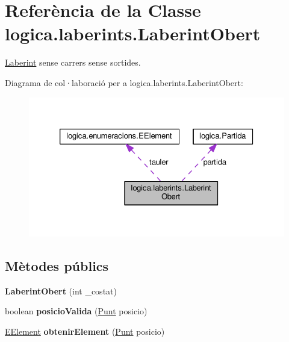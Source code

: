 \hypertarget{classlogica_1_1laberints_1_1_laberint_obert}{\section{Referència de la Classe logica.\+laberints.\+Laberint\+Obert}
\label{classlogica_1_1laberints_1_1_laberint_obert}
}


\hyperlink{classlogica_1_1laberints_1_1_laberint}{Laberint} sense carrers sense sortides.  




Diagrama de col·laboració per a logica.\+laberints.\+Laberint\+Obert\+:\nopagebreak
\begin{figure}[H]
\begin{center}
\leavevmode
\includegraphics[width=326pt]{classlogica_1_1laberints_1_1_laberint_obert__coll__graph}
\end{center}
\end{figure}
\subsection*{Mètodes públics}
\begin{DoxyCompactItemize}
\item 
\hypertarget{classlogica_1_1laberints_1_1_laberint_obert_afdde10c6fabcd77309d0f73db386e882}{{\bfseries Laberint\+Obert} (int \+\_\+costat)}\label{classlogica_1_1laberints_1_1_laberint_obert_afdde10c6fabcd77309d0f73db386e882}

\item 
\hypertarget{classlogica_1_1laberints_1_1_laberint_obert_a1b6f08607eef3204bdb1c93f664d994a}{boolean {\bfseries posicio\+Valida} (\hyperlink{classlogica_1_1_punt}{Punt} posicio)}\label{classlogica_1_1laberints_1_1_laberint_obert_a1b6f08607eef3204bdb1c93f664d994a}

\item 
\hypertarget{classlogica_1_1laberints_1_1_laberint_obert_ad67fa7d8e900664872b5c23b53cda2d3}{\hyperlink{enumlogica_1_1enumeracions_1_1_e_element}{E\+Element} {\bfseries obtenir\+Element} (\hyperlink{classlogica_1_1_punt}{Punt} posicio)}\label{classlogica_1_1laberints_1_1_laberint_obert_ad67fa7d8e900664872b5c23b53cda2d3}

\end{DoxyCompactItemize}

